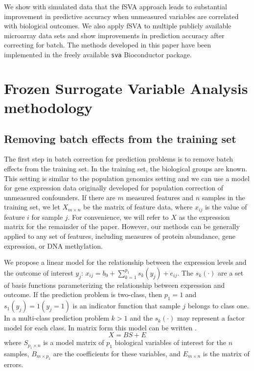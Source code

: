 \documentclass{bioinfo}\usepackage{graphicx, color}
\begin{document}
We show with simulated data that the fSVA approach leads to substantial improvement in predictive accuracy when unmeasured variables are correlated with biological outcomes. We also apply fSVA to multiple publicly available microarray data sets and show improvements in prediction accuracy after correcting for batch. The methods developed in this paper have been implemented in the freely available \texttt{sva} Bioconductor package. 


\section{Frozen Surrogate Variable Analysis methodology}

\subsection{Removing batch effects from the training set}
The first step in batch correction for prediction problems is to remove batch effects from the training set. In the training set, the biological groups are known. This setting is similar to the population genomics setting and we can use a model for gene expression data originally developed for population correction of unmeasured confounders. If there are $m$ measured features and $n$ samples in the training set, we let $X_{m \times n}$ be the matrix of feature data, where $x_{ij}$ is the value of feature $i$ for sample $j$. For convenience, we will refer to $X$ as the expression matrix for the remainder of the paper. However, our methods can be generally applied to any set of features, including measures of protein abundance, gene expression, or DNA methylation. 

We propose a linear model for the relationship between the expression levels and the outcome of interest $y_j$: $x_{ij} = b_0 + \sum_{k=1}^{p_1} s_k(y_j) + e_{ij}$. The $s_k(\cdot)$ are a set of basis functions parameterizing the relationship between expression and outcome. If the prediction problem is two-class, then $p_1 =1$ and $s_1(y_j) = 1(y_j = 1)$ is an indicator function that sample $j$ belongs to class one. In a multi-class prediction problem $k > 1$ and the $s_k(\cdot)$ may represent a factor model for each class. In matrix form this model can be written \citep{Leek2007,Leek2008}. 
\begin{equation}
X = BS + E
\label{eqn_before_batch}
\end{equation}
where $S_{p_1 \times n}$ is a model matrix of $p_1$ biological variables of interest for the $n$ samples, $B_{m \times p_1}$ are the coefficients for these variables, and  $E_{m \times n}$ is the matrix of errors. 
\end{document}
